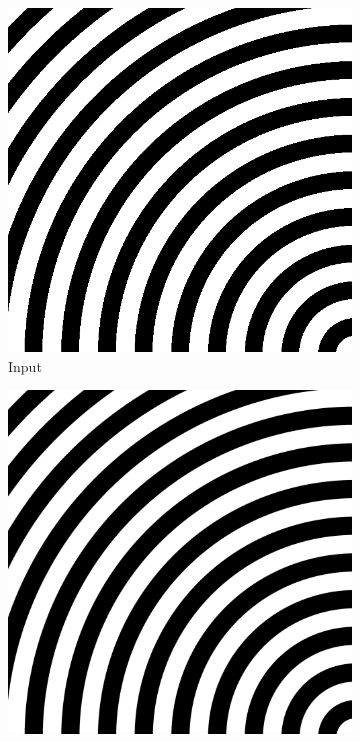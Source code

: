\documentclass[12pt,a4paper]{article}
\begin{document}
        \begin{figure}[H]
            \centering
            \begin{subfigure}{0.2\textwidth}
                \includegraphics[width=\textwidth]{images/samples/aliasing-4-input.png}
                \caption*{Input}
            \end{subfigure}
            \enspace
            \begin{subfigure}{0.2\textwidth}
                \includegraphics[width=\textwidth]{images/samples/aliasing-4-orig.png}

\end{subfigure}
\end{figure}
\end{document}
